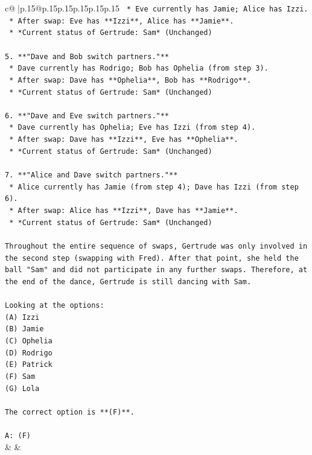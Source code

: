 \documentclass{article}
\begin{document}
{\begin{supertabular}{c@{$\;$}|p{.15\linewidth}@{}p{.15\linewidth}p{.15\linewidth}p{.15\linewidth}p{.15\linewidth}p{.15\linewidth}}
{{{\texttt{    *   Eve currently has Jamie; Alice has Izzi.} \\
\texttt{    *   After swap: Eve has **Izzi**, Alice has **Jamie**.} \\
\texttt{    *   *Current status of Gertrude: Sam* (Unchanged)} \\
\\ 
\texttt{5.  **"Dave and Bob switch partners."**} \\
\texttt{    *   Dave currently has Rodrigo; Bob has Ophelia (from step 3).} \\
\texttt{    *   After swap: Dave has **Ophelia**, Bob has **Rodrigo**.} \\
\texttt{    *   *Current status of Gertrude: Sam* (Unchanged)} \\
\\ 
\texttt{6.  **"Dave and Eve switch partners."**} \\
\texttt{    *   Dave currently has Ophelia; Eve has Izzi (from step 4).} \\
\texttt{    *   After swap: Dave has **Izzi**, Eve has **Ophelia**.} \\
\texttt{    *   *Current status of Gertrude: Sam* (Unchanged)} \\
\\ 
\texttt{7.  **"Alice and Dave switch partners."**} \\
\texttt{    *   Alice currently has Jamie (from step 4); Dave has Izzi (from step 6).} \\
\texttt{    *   After swap: Alice has **Izzi**, Dave has **Jamie**.} \\
\texttt{    *   *Current status of Gertrude: Sam* (Unchanged)} \\
\\ 
\texttt{Throughout the entire sequence of swaps, Gertrude was only involved in the second step (swapping with Fred). After that point, she held the ball "Sam" and did not participate in any further swaps. Therefore, at the end of the dance, Gertrude is still dancing with Sam.} \\
\\ 
\texttt{Looking at the options:} \\
\texttt{(A) Izzi} \\
\texttt{(B) Jamie} \\
\texttt{(C) Ophelia} \\
\texttt{(D) Rodrigo} \\
\texttt{(E) Patrick} \\
\texttt{(F) Sam} \\
\texttt{(G) Lola} \\
\\ 
\texttt{The correct option is **(F)**.} \\
\\ 
\texttt{A: (F)} \\
            }
        }
    }
    & & \\ \\


\end{supertabular}}
\end{document}
